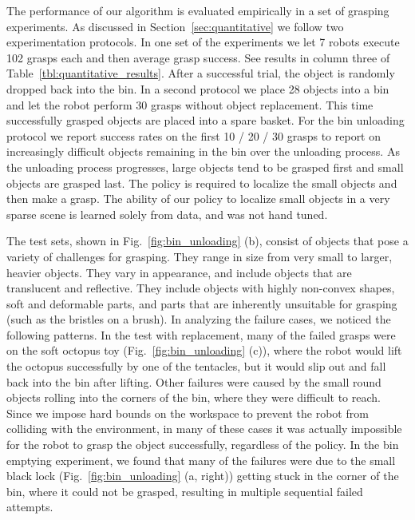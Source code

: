 \documentclass{article}
\begin{document}
The performance of our algorithm is evaluated empirically in a set of grasping experiments. As discussed in Section~\ref{sec:quantitative} we follow two experimentation protocols. In one set of the experiments we let 7 robots execute 102 grasps each and then average grasp success. See results in column three of Table~\ref{tbl:quantitative_results}. After a successful trial, the object is randomly dropped back into the bin. In a second protocol we place 28 objects into a bin and let the robot perform 30 grasps without object replacement. This time successfully grasped objects are placed into a spare basket. For the bin unloading protocol we report success rates on the first 10 / 20 / 30 grasps to report on increasingly difficult objects remaining in the bin over the unloading process. As the unloading process progresses, large objects tend to be grasped first and small objects are grasped last. The policy is required to localize the small objects and then make a grasp. The ability of our policy to localize small objects in a very sparse scene is learned solely from data, and was not hand tuned.

The test sets, shown in Fig.~\ref{fig:bin_unloading} (b), consist of objects that pose a variety of challenges for grasping. They range in size from very small to larger, heavier objects. They vary in appearance, and include objects that are translucent and reflective. They include objects with highly non-convex shapes, soft and deformable parts, and parts that are inherently unsuitable for grasping (such as the bristles on a brush).
In analyzing the failure cases, we noticed the following patterns. In the test with replacement, many of the failed grasps were on the soft octopus toy (Fig.~\ref{fig:bin_unloading} (c)), where the robot would lift the octopus successfully by one of the tentacles, but it would slip out and fall back into the bin after lifting. Other failures were caused by the small round objects rolling into the corners of the bin, where they were difficult to reach. Since we impose hard bounds on the workspace to prevent the robot from colliding with the environment, in many of these cases it was actually impossible for the robot to grasp the object successfully, regardless of the policy.
In the bin emptying experiment, we found that many of the failures were due to the small black lock (Fig.~\ref{fig:bin_unloading} (a, right)) getting stuck in the corner of the bin, where it could not be grasped, resulting in multiple sequential failed attempts.
\end{document}
